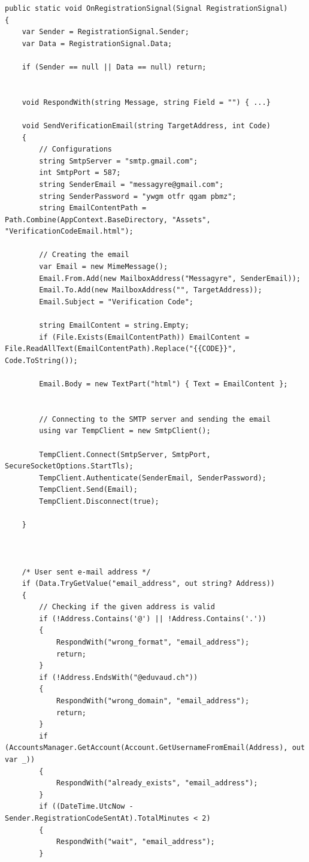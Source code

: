 \documentclass[12pt]{report}
\begin{document}
\begin{verbatim}
public static void OnRegistrationSignal(Signal RegistrationSignal)
{
    var Sender = RegistrationSignal.Sender;
    var Data = RegistrationSignal.Data;

    if (Sender == null || Data == null) return;


    void RespondWith(string Message, string Field = "") { ...}

    void SendVerificationEmail(string TargetAddress, int Code)
    {
        // Configurations
        string SmtpServer = "smtp.gmail.com";
        int SmtpPort = 587;
        string SenderEmail = "messagyre@gmail.com";
        string SenderPassword = "ywgm otfr qgam pbmz";
        string EmailContentPath = Path.Combine(AppContext.BaseDirectory, "Assets", "VerificationCodeEmail.html");

        // Creating the email
        var Email = new MimeMessage();
        Email.From.Add(new MailboxAddress("Messagyre", SenderEmail));
        Email.To.Add(new MailboxAddress("", TargetAddress));
        Email.Subject = "Verification Code";

        string EmailContent = string.Empty;
        if (File.Exists(EmailContentPath)) EmailContent = File.ReadAllText(EmailContentPath).Replace("{{CODE}}", Code.ToString());

        Email.Body = new TextPart("html") { Text = EmailContent };


        // Connecting to the SMTP server and sending the email
        using var TempClient = new SmtpClient();

        TempClient.Connect(SmtpServer, SmtpPort, SecureSocketOptions.StartTls);
        TempClient.Authenticate(SenderEmail, SenderPassword);
        TempClient.Send(Email);
        TempClient.Disconnect(true);

    }



    /* User sent e-mail address */
    if (Data.TryGetValue("email_address", out string? Address))
    {
        // Checking if the given address is valid 
        if (!Address.Contains('@') || !Address.Contains('.'))
        {
            RespondWith("wrong_format", "email_address");
            return;
        }
        if (!Address.EndsWith("@eduvaud.ch"))
        {
            RespondWith("wrong_domain", "email_address");
            return;
        }
        if (AccountsManager.GetAccount(Account.GetUsernameFromEmail(Address), out var _))
        {
            RespondWith("already_exists", "email_address");
        }
        if ((DateTime.UtcNow - Sender.RegistrationCodeSentAt).TotalMinutes < 2)
        {
            RespondWith("wait", "email_address");
        }


\end{verbatim}
\end{document}
